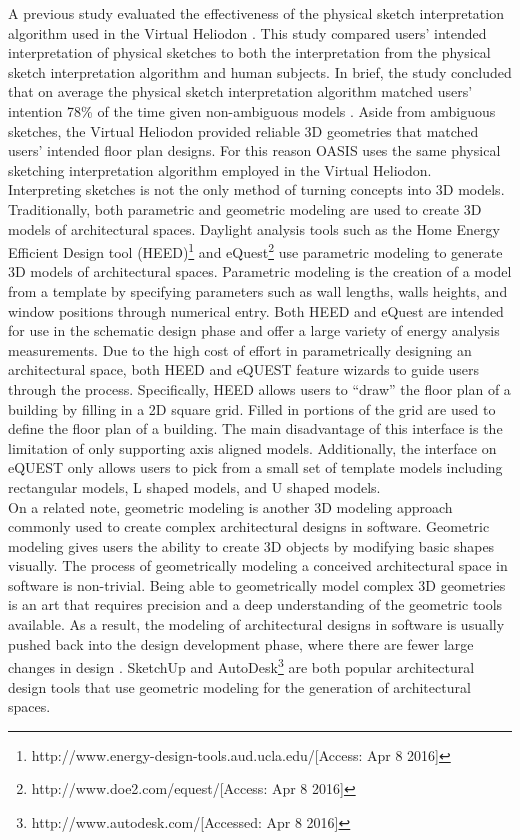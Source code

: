 A previous study evaluated the effectiveness of the physical sketch interpretation algorithm used in the Virtual Heliodon \cite{cutler2009inferring}.  This study compared users' intended interpretation of physical sketches to both the interpretation from the physical sketch interpretation algorithm and human subjects.  In brief, the study concluded that on average the physical sketch interpretation algorithm matched users' intention 78\% of the time given non-ambiguous models \cite{cutler2009inferring}.  Aside from ambiguous sketches, the Virtual Heliodon provided reliable 3D geometries that matched users' intended floor plan designs.  For this reason OASIS uses the same physical sketching interpretation algorithm employed in the Virtual Heliodon.\\

Interpreting sketches is not the only method of turning concepts into 3D models.  Traditionally, both parametric and geometric modeling are used to create 3D models of architectural spaces.  Daylight analysis tools such as the Home Energy Efficient Design tool (HEED)\footnote{http://www.energy-design-tools.aud.ucla.edu/[Access: Apr 8 2016]} and eQuest\footnote{http://www.doe2.com/equest/[Access: Apr 8 2016]} use parametric modeling to generate 3D models of architectural spaces.  Parametric modeling is the creation of a model from a template by specifying parameters such as wall lengths, walls heights, and window positions through numerical entry.  Both HEED and eQuest are intended for use in the schematic design phase and offer a large variety of energy analysis measurements.  Due to the high cost of effort in parametrically designing an architectural space, both HEED and eQUEST feature wizards to guide users through the process.  Specifically, HEED allows users to ``draw'' the floor plan of a building by filling in a 2D square grid. Filled in portions of the grid are used to define the floor plan of a building. The main disadvantage of this interface is the limitation of only supporting axis aligned models.  Additionally, the interface on eQUEST only allows users to pick from a small set of template models including rectangular models, L shaped models, and U shaped models.\\ 

On a related note, geometric modeling is another 3D modeling approach commonly used to create complex architectural designs in software.  Geometric modeling gives users the ability to create 3D objects by modifying basic shapes visually.  The process of geometrically modeling a conceived architectural space in software is non-trivial.  Being able to geometrically model complex 3D geometries is an art that requires precision and a deep understanding of the geometric tools available.  As a result, the modeling of architectural designs in software is usually pushed back into the design development phase, where there are fewer large changes in design \cite{Galasiu}.  SketchUp and AutoDesk\footnote{http://www.autodesk.com/[Accessed: Apr 8 2016]} are both popular architectural design tools that use geometric modeling for the generation of architectural spaces. \\

